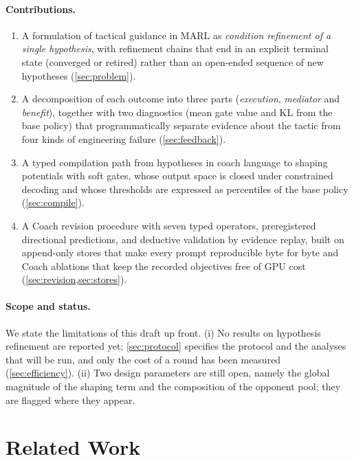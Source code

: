 \documentclass[11pt]{article}
\begin{document}
\paragraph{Contributions.}
\begin{enumerate}[leftmargin=*,itemsep=2pt]
  \item A formulation of tactical guidance in MARL as \emph{condition refinement of a single hypothesis}, with refinement chains that end in an explicit terminal state (converged or retired) rather than an open-ended sequence of new hypotheses (\cref{sec:problem}).
  \item A decomposition of each outcome into three parts (\emph{execution}, \emph{mediator} and \emph{benefit}), together with two diagnostics (mean gate value and KL from the base policy) that programmatically separate evidence about the tactic from four kinds of engineering failure (\cref{sec:feedback}).
  \item A typed compilation path from hypotheses in coach language to shaping potentials with soft gates, whose output space is closed under constrained decoding and whose thresholds are expressed as percentiles of the base policy (\cref{sec:compile}).
  \item A Coach revision procedure with seven typed operators, preregistered directional predictions, and deductive validation by evidence replay, built on append-only stores that make every prompt reproducible byte for byte and Coach ablations that keep the recorded objectives free of GPU cost (\cref{sec:revision,sec:stores}).
\end{enumerate}

\paragraph{Scope and status.}
We state the limitations of this draft up front.
(i) No results on hypothesis refinement are reported yet; \cref{sec:protocol} specifies the protocol and the analyses that will be run, and only the cost of a round has been measured (\cref{sec:efficiency}).
(ii) Two design parameters are still open, namely the global magnitude of the shaping term and the composition of the opponent pool; they are flagged where they appear.

\section{Related Work}
\label{sec:related}
\end{document}

